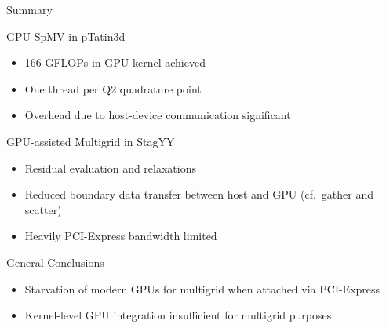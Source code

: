 \begin{frame}{Summary}

 \begin{block}{GPU-SpMV in pTatin3d}
   \begin{itemize}
    \item 166 GFLOPs in GPU kernel achieved
    \item One thread per Q2 quadrature point
    \item Overhead due to host-device communication significant
   \end{itemize}
 \end{block}

 \begin{block}{GPU-assisted Multigrid in StagYY}
   \begin{itemize}
    \item Residual evaluation and relaxations
    \item Reduced boundary data transfer between host and GPU (cf.~gather and scatter)
    \item Heavily PCI-Express bandwidth limited
   \end{itemize}
 \end{block}

 \begin{block}{General Conclusions}
   \begin{itemize}
    \item Starvation of modern GPUs for multigrid when attached via PCI-Express 
    \item Kernel-level GPU integration insufficient for multigrid purposes
   \end{itemize}
 \end{block}

\end{frame}

